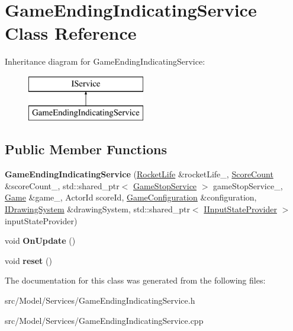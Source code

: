 \hypertarget{classGameEndingIndicatingService}{}\section{Game\+Ending\+Indicating\+Service Class Reference}
\label{classGameEndingIndicatingService}
Inheritance diagram for Game\+Ending\+Indicating\+Service\+:\begin{figure}[H]
\begin{center}
\leavevmode
\includegraphics[height=2.000000cm]{classGameEndingIndicatingService}
\end{center}
\end{figure}
\subsection*{Public Member Functions}
\begin{DoxyCompactItemize}
\item 
{\bfseries Game\+Ending\+Indicating\+Service} (\hyperlink{classRocketLife}{Rocket\+Life} \&rocket\+Life\+\_\+, \hyperlink{classScoreCount}{Score\+Count} \&score\+Count\+\_\+, std\+::shared\+\_\+ptr$<$ \hyperlink{classGameStopService}{Game\+Stop\+Service} $>$ game\+Stop\+Service\+\_\+, \hyperlink{classGame}{Game} \&game\+\_\+, Actor\+Id score\+Id, \hyperlink{classGameConfiguration}{Game\+Configuration} \&configuration, \hyperlink{classIDrawingSystem}{I\+Drawing\+System} \&drawing\+System, std\+::shared\+\_\+ptr$<$ \hyperlink{classIInputStateProvider}{I\+Input\+State\+Provider} $>$ input\+State\+Provider)\hypertarget{classGameEndingIndicatingService_af6b266236264bbbfe21db486f9c64fb3}{}\label{classGameEndingIndicatingService_af6b266236264bbbfe21db486f9c64fb3}

\item 
void {\bfseries On\+Update} ()\hypertarget{classGameEndingIndicatingService_aed09cbea0f7e1280a7bbdbca1aee6882}{}\label{classGameEndingIndicatingService_aed09cbea0f7e1280a7bbdbca1aee6882}

\item 
void {\bfseries reset} ()\hypertarget{classGameEndingIndicatingService_a700c3c05db4f7e4d164173136012b00d}{}\label{classGameEndingIndicatingService_a700c3c05db4f7e4d164173136012b00d}

\end{DoxyCompactItemize}


The documentation for this class was generated from the following files\+:\begin{DoxyCompactItemize}
\item 
src/\+Model/\+Services/Game\+Ending\+Indicating\+Service.\+h\item 
src/\+Model/\+Services/Game\+Ending\+Indicating\+Service.\+cpp\end{DoxyCompactItemize}
